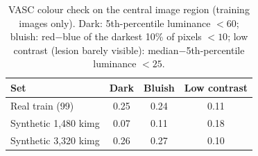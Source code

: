 \begin{table}[t]
\centering
\caption{VASC colour check on the central image region (training images only). Dark: 5th-percentile luminance $<60$; bluish: red$-$blue of the darkest 10\% of pixels $<10$; low contrast (lesion barely visible): median$-$5th-percentile luminance $<25$.}
\label{tab:vasc}
\begin{tabular}{lccc}
\toprule
Set & Dark & Bluish & Low contrast \\
\midrule
Real train (99) & 0.25 & 0.24 & 0.11 \\
Synthetic 1,480 kimg & 0.07 & 0.11 & 0.18 \\
Synthetic 3,320 kimg & 0.26 & 0.27 & 0.10 \\
\bottomrule
\end{tabular}
\end{table}
